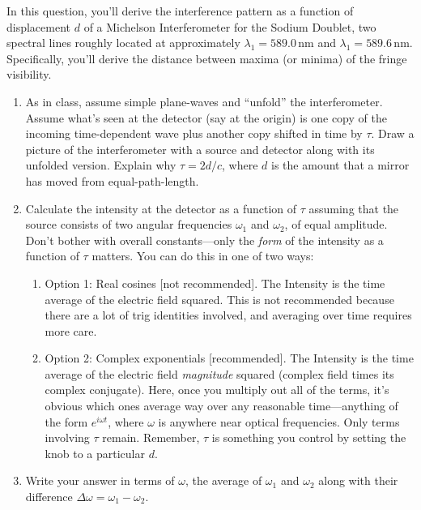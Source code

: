 \documentclass[11pt]{hmcpset}
\begin{document}
\problemlist{}



\begin{problem}
	In this question, you'll derive the interference pattern as a function of displacement $d$ of a Michelson Interferometer for the Sodium Doublet, two spectral lines roughly located at approximately $\lambda_1=589.0$\,nm and $\lambda_1=589.6$\,nm. Specifically, you'll derive the distance between maxima (or minima) of the fringe visibility.
	\begin{enumerate}
		\item As in class, assume simple plane-waves and ``unfold'' the interferometer. Assume what's seen at the detector (say at the origin) is one copy of the incoming time-dependent wave plus another copy shifted in time by $\tau$. Draw a picture of the interferometer with a source and detector along with its unfolded version. Explain why $\tau=2d/c$, where $d$ is the amount that a mirror has moved from equal-path-length.
		\item Calculate the intensity at the detector as a function of $\tau$ assuming that the source consists of two angular frequencies $\omega_1$ and $\omega_2$, of equal amplitude. Don't bother with overall constants---only the \textit{form} of the intensity as a function of $\tau$ matters. You can do this in one of two ways:
		\begin{enumerate}
			\item Option 1: Real cosines [not recommended]. The Intensity is the time average of the electric field squared. This is not recommended because there are a lot of trig identities involved, and averaging over time requires more care.
			\item Option 2: Complex exponentials [recommended]. The Intensity is the time average of the electric field \textit{magnitude} squared (complex field times its complex conjugate). Here, once you multiply out all of the terms, it's obvious which ones average way over any reasonable time---anything of the form $e^{i \omega t}$, where $\omega$ is anywhere near optical frequencies. Only terms involving $\tau$ remain. Remember, $\tau$ is something you control by setting the knob to a particular $d$.
		\end{enumerate}
	\item Write your answer in terms of $\omega$, the average of $\omega_1$ and $\omega_2$ along with their difference $\Delta \omega=\omega_1 - \omega_2$.

\end{enumerate}
\end{problem}
\end{document}
